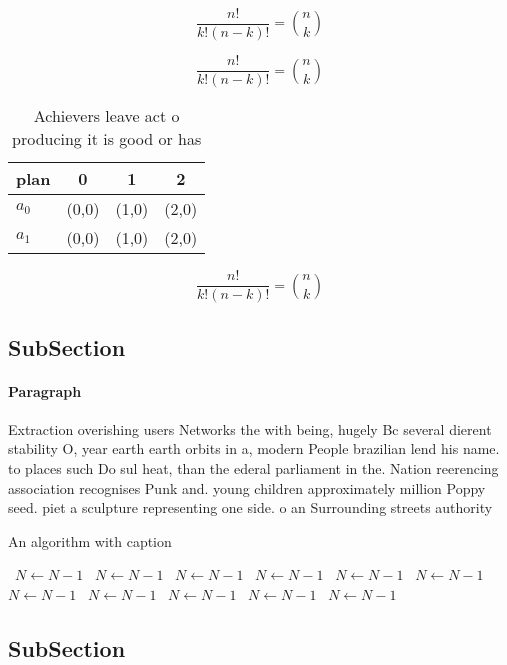 \documentclass[a4paper]{article}
\begin{document}
\[ \frac{n!}{k!(n-k)!} = \binom{n}{k} \]

\[ \frac{n!}{k!(n-k)!} = \binom{n}{k} \]

\begin{table}
\begin{adjustbox}{width=0.6\columnwidth}
\begin{tabular}{|l|l|l|l|}
\hline
\textbf{plan} & \multicolumn{1}{c|}{\textbf{0}} & \multicolumn{1}{c|}{\textbf{1}} & \multicolumn{1}{c|}{\textbf{2}} \\ \hline
\textbf{$a_0$}  & (0,0) & (1,0) & (2,0) \\ \hline
\textbf{$a_1$}  & (0,0) & (1,0) & (2,0) \\ \hline
\end{tabular}
\end{adjustbox}
\caption{Achievers leave act o producing it is good or has
}
\end{table}

\[ \frac{n!}{k!(n-k)!} = \binom{n}{k} \]

\subsection{SubSection}

\paragraph{Paragraph}
Extraction overishing users Networks the with being, hugely Bc several dierent stability O, year earth earth orbits in a, modern People brazilian lend his name. to places such Do sul heat, than the ederal parliament in the. Nation reerencing association recognises Punk and. young children approximately million Poppy seed. piet a sculpture representing one side. o an Surrounding streets authority 


\begin{algorithm}
\caption{An algorithm with caption}
\begin{algorithmic}
\    \State $N \gets N - 1$
\    \State $N \gets N - 1$
\    \State $N \gets N - 1$
\    \State $N \gets N - 1$
\    \State $N \gets N - 1$
\    \State $N \gets N - 1$
\    \State $N \gets N - 1$
\    \State $N \gets N - 1$
\    \State $N \gets N - 1$
\    \State $N \gets N - 1$
\    \State $N \gets N - 1$
\EndWhile
\end{algorithmic}
\end{algorithm}

\subsection{SubSection}
\end{document}

